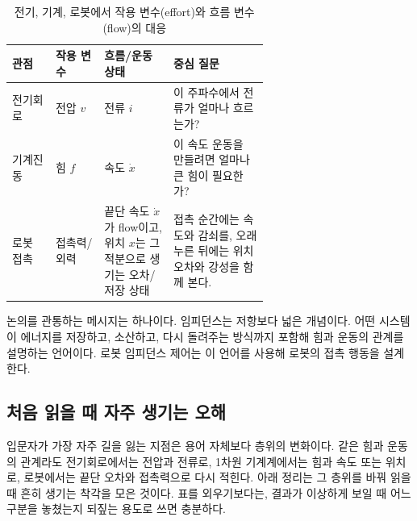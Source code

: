\begin{table}[!htbp]
  \centering
  \caption{전기, 기계, 로봇에서 작용 변수(effort)와 흐름 변수(flow)의 대응}
  \small
  \setlength{\tabcolsep}{4pt}
  \begin{tabularx}{\linewidth}{@{}>{\raggedright\arraybackslash}p{0.17\linewidth}>{\raggedright\arraybackslash}p{0.19\linewidth}>{\raggedright\arraybackslash}p{0.27\linewidth}>{\raggedright\arraybackslash}X@{}}
    \toprule
    관점 & 작용 변수 & 흐름/운동 상태 & 중심 질문 \\
    \midrule
    전기회로 & 전압 $v$ & 전류 $i$ & 이 주파수에서 전류가 얼마나 흐르는가? \\
    기계진동 & 힘 $f$ & 속도 $\dot{x}$ & 이 속도 운동을 만들려면 얼마나 큰 힘이 필요한가? \\
    로봇 접촉 & 접촉력/외력 & 끝단 속도 $\dot{x}$가 flow이고, 위치 $x$는 그 적분으로 생기는 오차/저장 상태 & 접촉 순간에는 속도와 감쇠를, 오래 누른 뒤에는 위치 오차와 강성을 함께 본다. \\
    \bottomrule
  \end{tabularx}
\end{table}

논의를 관통하는 메시지는 하나이다.
임피던스는 저항보다 넓은 개념이다.
어떤 시스템이 에너지를 저장하고, 소산하고, 다시 돌려주는 방식까지 포함해 힘과 운동의 관계를 설명하는 언어이다.
로봇 임피던스 제어는 이 언어를 사용해 로봇의 접촉 행동을 설계한다.

\subsection{처음 읽을 때 자주 생기는 오해}

입문자가 가장 자주 길을 잃는 지점은 용어 자체보다 층위의 변화이다.
같은 힘과 운동의 관계라도 전기회로에서는 전압과 전류로, 1차원 기계계에서는 힘과 속도 또는 위치로, 로봇에서는 끝단 오차와 접촉력으로 다시 적힌다.
아래 정리는 그 층위를 바꿔 읽을 때 흔히 생기는 착각을 모은 것이다.
표를 외우기보다는, 결과가 이상하게 보일 때 어느 구분을 놓쳤는지 되짚는 용도로 쓰면 충분하다.

